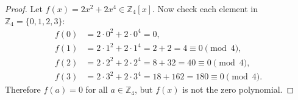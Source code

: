 \begin{proof}
    Let $f(x) = 2x^2 + 2x^4 \in \mathbb{Z}_4[x]$.  
    Now check each element in $\mathbb{Z}_4 = \{0,1,2,3\}$:
    \[
    \begin{aligned}
    f(0) &= 2 \cdot 0^2 + 2 \cdot 0^4 = 0, \\
    f(1) &= 2 \cdot 1^2 + 2 \cdot 1^4 = 2 + 2 = 4 \equiv 0 \pmod{4}, \\
    f(2) &= 2 \cdot 2^2 + 2 \cdot 2^4 = 8 + 32 = 40 \equiv 0 \pmod{4}, \\
    f(3) &= 2 \cdot 3^2 + 2 \cdot 3^4 = 18 + 162 = 180 \equiv 0 \pmod{4}.
    \end{aligned}
    \]
    Therefore $f(a) = 0$ for all $a \in \mathbb{Z}_4$, but $f(x)$ is not the zero polynomial.
\end{proof}